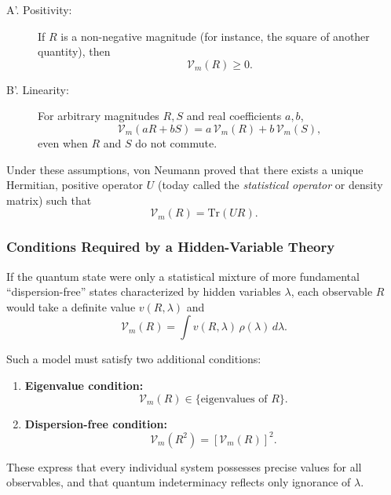 \begin{description}
    \item[A'. Positivity:] If $R$ is a non-negative magnitude (for instance, the square of another quantity), then
    \begin{equation}
        \mathcal{V}_m(R) \ge 0.
    \end{equation}

    \item[B'. Linearity:] For arbitrary magnitudes $R,S$ and real coefficients $a,b$,
    \begin{equation}
        \mathcal{V}_m(aR + bS) = a\,\mathcal{V}_m(R) + b\,\mathcal{V}_m(S),
    \end{equation}
    even when $R$ and $S$ do not commute. 
\end{description}

Under these assumptions, von Neumann proved that there exists a unique Hermitian, positive operator $U$ (today called the \textit{statistical operator} or density matrix) such that
\begin{equation}
    \mathcal{V}_m(R) = \mathrm{Tr}(UR).
\end{equation}

\vspace{0.3cm}

\subsubsection*{Conditions Required by a Hidden-Variable Theory}

If the quantum state were only a statistical mixture of more fundamental ``dispersion-free'' states characterized by hidden variables $\lambda$, each observable $R$ would take a definite value $v(R,\lambda)$ and
\begin{equation}
    \mathcal{V}_m(R) = \int v(R,\lambda)\,\rho(\lambda)\,d\lambda.
\end{equation}

Such a model must satisfy two additional conditions:

\begin{enumerate}
    \item \textbf{Eigenvalue condition:}
    \[
    \mathcal{V}_m(R) \in \{\text{eigenvalues of } R\}.
    \]
    \item \textbf{Dispersion-free condition:}
    \[
    \mathcal{V}_m(R^2) = [\mathcal{V}_m(R)]^2.
    \]
\end{enumerate}

These express that every individual system possesses precise values for all observables, and that quantum indeterminacy reflects only ignorance of $\lambda$.

